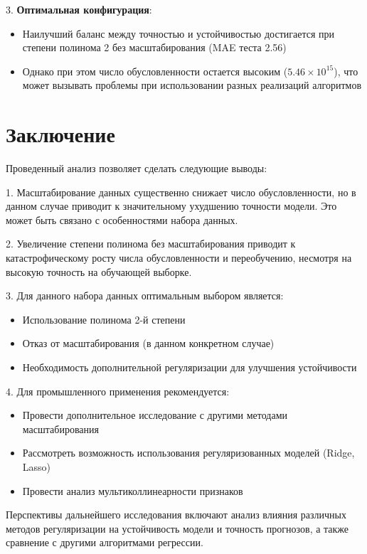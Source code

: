 \documentclass{article}
\begin{document}
3. \textbf{Оптимальная конфигурация}:
\begin{itemize}
    \item Наилучший баланс между точностью и устойчивостью достигается при степени полинома 2 без масштабирования (MAE теста 2.56)
    \item Однако при этом число обусловленности остается высоким (\(5.46 \times 10^{15}\)), что может вызывать проблемы при использовании разных реализаций алгоритмов
\end{itemize}

\section{Заключение}
Проведенный анализ позволяет сделать следующие выводы:

1. Масштабирование данных существенно снижает число обусловленности, но в данном случае приводит к значительному ухудшению точности модели. Это может быть связано с особенностями набора данных.

2. Увеличение степени полинома без масштабирования приводит к катастрофическому росту числа обусловленности и переобучению, несмотря на высокую точность на обучающей выборке.

3. Для данного набора данных оптимальным выбором является:
\begin{itemize}
    \item Использование полинома 2-й степени
    \item Отказ от масштабирования (в данном конкретном случае)
    \item Необходимость дополнительной регуляризации для улучшения устойчивости
\end{itemize}

4. Для промышленного применения рекомендуется:
\begin{itemize}
    \item Провести дополнительное исследование с другими методами масштабирования
    \item Рассмотреть возможность использования регуляризованных моделей (Ridge, Lasso)
    \item Провести анализ мультиколлинеарности признаков
\end{itemize}

Перспективы дальнейшего исследования включают анализ влияния различных методов регуляризации на устойчивость модели и точность прогнозов, а также сравнение с другими алгоритмами регрессии.
\end{document}
